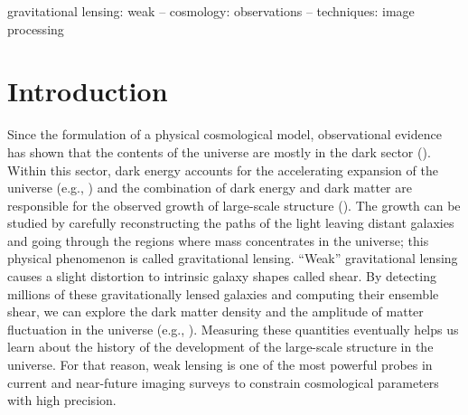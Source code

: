 \documentclass[fleqn,usenatbib]{mnras}
\begin{document}
\begin{keywords}
gravitational lensing: weak -- cosmology: observations -- techniques: image processing
\end{keywords}



\section{Introduction}

Since the formulation of a physical cosmological model, observational evidence has shown that the contents of the universe are mostly in the dark sector (\citealt{2020A&A...641A...8P, 2020MNRAS.498.2492G, 2020MNRAS.499.5527T, 2021A&A...645A.104A, 2022PhRvD.105b3520A, 2022arXiv220204077B}). Within this sector, dark energy accounts for the accelerating expansion of the universe (e.g., \citealt{1998AJ....116.1009R, 1999AIPC..478..129P}) and the combination of dark energy and dark matter are responsible for the observed growth of large-scale structure (\citealt{2015RPPh...78h6901K, 2017grle.book.....D}). The growth can be studied by carefully reconstructing the paths of the light leaving distant galaxies and going through the regions where mass concentrates in the universe; this physical phenomenon is called gravitational lensing. “Weak” gravitational lensing causes a slight distortion to intrinsic galaxy shapes called shear. By detecting millions of these gravitationally lensed galaxies and computing their ensemble shear, we can explore the dark matter density and the amplitude of matter fluctuation in the universe (e.g., \citealt{2001PhR...340..291B}). Measuring these quantities eventually helps us learn about the history of the development of the large-scale structure in the universe. For that reason, weak lensing is one of the most powerful probes in current and near-future imaging surveys to constrain cosmological parameters with high precision. 
\end{document}
